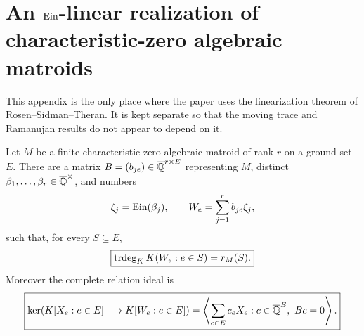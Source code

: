 \section{An \texorpdfstring{\(\operatorname{Ein}\)}{Ein}-linear realization of
characteristic-zero algebraic matroids}
\label{app:Ein-matroids}

This appendix is the only place where the paper uses the linearization
theorem of Rosen--Sidman--Theran.  It is kept separate so that the moving
trace and Ramanujan results do not appear to depend on it.

\begin{theorem}
\label{thm:matroid-Ein-realization}
Let \(M\) be a finite characteristic-zero algebraic matroid of rank \(r\)
on a ground set \(E\).  There are a matrix
\(B=(b_{je})\in\overline{\mathbb Q}^{r\times E}\) representing \(M\), distinct
\(\beta_1,\ldots,\beta_r\in\overline{\mathbb Q}^\times\), and numbers
\begin{equation}\label{eq:matroid-Ein-realization}
 \xi_j=\operatorname{Ein}(\beta_j),\qquad
 W_e=\sum_{j=1}^r b_{je}\xi_j,
\end{equation}
such that, for every \(S\subseteq E\),
\begin{equation}\label{eq:matroid-rank-realization}
 \boxed{\displaystyle
 \operatorname{trdeg}_KK(W_e:e\in S)=r_M(S).}
\end{equation}
Moreover the complete relation ideal is
\begin{equation}\label{eq:matroid-linear-ideal}
 \boxed{\displaystyle
 \ker\!\left(K[X_e:e\in E]\longrightarrow K[W_e:e\in E]\right)
 =\left\langle\sum_{e\in E}c_eX_e:
 c\in\overline{\mathbb Q}^E,\ Bc=0\right\rangle.}
\end{equation}
\end{theorem}

